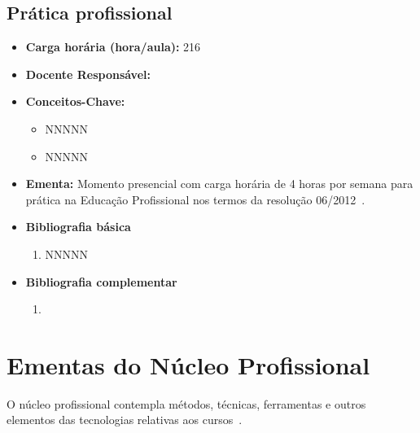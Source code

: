\documentclass[11pt,fleqn]{book} %
\begin{document}
\subsection{Prática profissional}\label{disc:pratica}
\begin{itemize}
	\item \textbf{Carga horária (hora/aula):} 216
	\item \textbf{Docente Responsável:}
	\item \textbf{Conceitos-Chave:}
	\begin{itemize}
		\item NNNNN
		\item NNNNN
	\end{itemize}
	\item \textbf{Ementa:} Momento presencial com carga horária de 4 horas por semana para prática na Educação Profissional nos termos da resolução 06/2012~\cite{Resolucao06De2012}.
	\item \textbf{Bibliografia básica}
	\begin{enumerate}
		\item NNNNN
	\end{enumerate}
	\item \textbf{Bibliografia complementar}
	\begin{enumerate}
		\item 
	\end{enumerate}	
\end{itemize}

\newpage
\section{Ementas do Núcleo Profissional}\label{ementasTecnico}
\indent

O núcleo profissional contempla métodos, técnicas, ferramentas e outros elementos das tecnologias relativas aos cursos~\cite{Resolucao06De2012}.

\newpage
\end{document}
